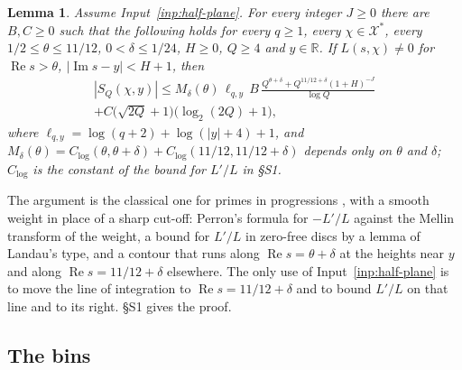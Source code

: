 \documentclass[11pt]{article}
\newtheorem{lemma}[theorem]{Lemma}
\theoremstyle{definition}
\begin{document}
\begin{lemma}\label{lem:prime-sum}
Assume Input~\ref{inp:half-plane}. For every integer $J \ge 0$ there are $B, C \ge 0$ such that the following holds
for every $q \ge 1$, every
$\chi \in \mathcal X^*$, every $1/2 \le \theta \le 11/12$, $0 < \delta \le 1/24$, $H \ge 0$, $Q \ge 4$ and
$y \in \mathbb R$. If $L(s, \chi) \ne 0$ for $\operatorname{Re} s > \theta$, $|\operatorname{Im} s - y| < H + 1$,
then
\begin{multline*}
  |S_Q(\chi, y)| \le M_\delta(\theta)\, \ell_{q, y}\, B\,
  \frac{Q^{\theta + \delta} + Q^{11/12 + \delta}(1 + H)^{-J}}{\log Q} \\
  + C\bigl(\sqrt{2Q} + 1\bigr)\bigl(\log_2 (2Q) + 1\bigr),
\end{multline*}
where $\ell_{q, y} = \log(q + 2) + \log(|y| + 4) + 1$, and $M_\delta(\theta) = C_{\log}(\theta, \theta + \delta) +
C_{\log}(11/12, 11/12 + \delta)$ depends only on $\theta$ and $\delta$; $C_{\log}$ is the constant of the bound for
$L'/L$ in \S S1.
\end{lemma}

The argument is the classical one for primes in progressions \cite[Chapter~5]{iwaniec-kowalski}, with a smooth weight in
place of a sharp cut-off:
Perron's formula for $-L'/L$ against the Mellin transform of the weight, a bound for $L'/L$ in zero-free discs by a
lemma of Landau's type, and a contour that runs along $\operatorname{Re} s = \theta + \delta$ at the heights near $y$
and along $\operatorname{Re} s = 11/12 + \delta$ elsewhere. The only use of Input~\ref{inp:half-plane} is to move the
line of integration to $\operatorname{Re} s = 11/12 + \delta$ and to bound $L'/L$ on that line and to its right.
\S S1 gives the proof.

\subsection{The bins}\label{sec:bins}
\end{document}

